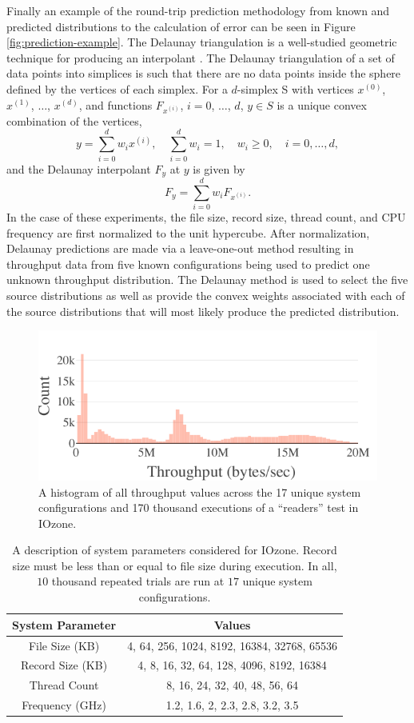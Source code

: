 \documentclass[letterpaper, 10 pt, conference]{ieeeconf}  %
\begin{document}
Finally an example of the round-trip prediction methodology from known and predicted distributions to the calculation of error can be seen in Figure \ref{fig:prediction-example}. The Delaunay triangulation is a well-studied geometric technique for producing an interpolant \cite{lee1980two}. The Delaunay triangulation of a set of data points into simplices is such that there are no data points inside the sphere defined by the vertices of each simplex. For a $d$-simplex S with vertices $x^{(0)}$, $x^{(1)}$, $\ldots$, $x^{(d)}$, and functions $F_{x^{(i)}}$, $i=0$, $\ldots$, $d$, $y \in S$ is a unique convex combination of the vertices,
$$ y = \sum_{i=0}^{d} w_i x^{(i)}, \quad \sum_{i=0}^{d} w_i = 1, \quad w_i \geq 0, \quad i=0,\ldots,d, $$
and the Delaunay interpolant $F_y$ at $y$ is given by
$$ F_y = \sum_{i=0}^{d} w_i F_{x^{(i)}}. $$
In the case of these experiments, the file size, record size, thread count, and CPU frequency are first normalized to the unit hypercube. After normalization, Delaunay predictions are made via a leave-one-out method resulting in throughput data from five known configurations being used to predict one unknown throughput distribution. The Delaunay method is used to select the five source distributions as well as provide the convex weights associated with each of the source distributions that will most likely produce the predicted distribution.


\begin{figure}
  \vspace{-.3cm}
  \includegraphics[width=.5\textwidth]{throughput-histogram.pdf}
  \caption{A histogram of all throughput values across the 17 unique system configurations and 170 thousand executions of a ``readers'' test in IOzone.}
  \label{fig:throughput_histogram}
\end{figure}

\begin{table}
  \centering
  \begin{tabular}{c|c}
    \hline
    \textbf{System Parameter} & \textbf{Values}\\
    \hline
    File Size (KB) & 4, 64, 256, 1024, 8192, 16384, 32768, 65536\\
    \hline
    Record Size (KB) & 4, 8, 16, 32, 64, 128, 4096, 8192, 16384\\
    \hline
    Thread Count & 8, 16, 24, 32, 40, 48, 56, 64\\
    \hline
    Frequency (GHz) & 1.2, 1.6, 2, 2.3, 2.8, 3.2, 3.5\\
    \hline
  \end{tabular}
  \caption{A description of system parameters considered for IOzone. Record size must be less than or equal to file size during execution. In all, $10$ thousand repeated trials are run at $17$ unique system configurations.
    \vspace{-.5cm}}
  \label{tab:data_description}
\end{table}
\end{document}

